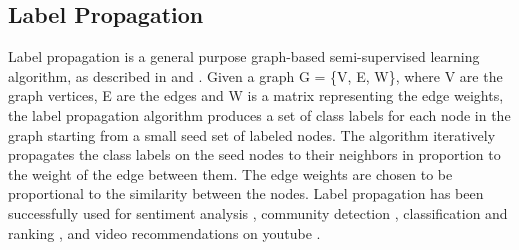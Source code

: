 \subsection{Label Propagation}
Label propagation is a general purpose graph-based semi-supervised learning algorithm, as described in \cite{zhu2002learning} and \cite{talukdar:09}.
Given a graph G = \{V, E, W\}, where V are the graph vertices, E are the edges and W is a matrix representing the edge weights, the label propagation algorithm produces a set of class labels for each node in the graph starting from a small seed set of labeled nodes.
The algorithm iteratively propagates the class labels on the seed nodes to their neighbors in proportion to the weight of the edge between them.
The edge weights are chosen to be proportional to the similarity between the nodes.
Label propagation has been successfully used for sentiment analysis \cite{speriosu2011twitter}, community detection \cite{raghavan2007near}, classification and ranking \cite{talukdar:10}, and video recommendations on youtube \cite{baluja2008video}.
